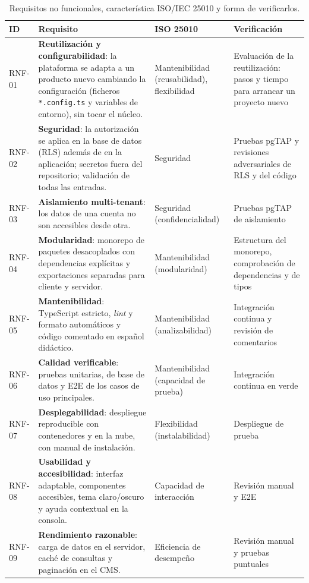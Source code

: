 \begin{table}[htbp]
  \centering
  \footnotesize
  \caption{Requisitos no funcionales, característica ISO/IEC 25010 y forma de verificarlos.}
  \label{tab:req-rnf}
  \begin{tabularx}{\textwidth}{@{}l>{\raggedright\arraybackslash}p{5.4cm}>{\raggedright\arraybackslash}p{2.2cm}X@{}}
    \toprule
    \textbf{ID} & \textbf{Requisito} & \textbf{ISO 25010} & \textbf{Verificación} \\
    \midrule
    RNF-01 & \textbf{Reutilización y configurabilidad}: la plataforma se adapta a un producto nuevo cambiando la configuración (ficheros \texttt{*.config.ts} y variables de entorno), sin tocar el núcleo. & Mantenibilidad (reusabilidad), flexibilidad & Evaluación de la reutilización: pasos y tiempo para arrancar un proyecto nuevo \\
    RNF-02 & \textbf{Seguridad}: la autorización se aplica en la base de datos (RLS) además de en la aplicación; secretos fuera del repositorio; validación de todas las entradas. & Seguridad & Pruebas pgTAP y revisiones adversariales de RLS y del código \\
    RNF-03 & \textbf{Aislamiento multi-tenant}: los datos de una cuenta no son accesibles desde otra. & Seguridad (confidencialidad) & Pruebas pgTAP de aislamiento \\
    RNF-04 & \textbf{Modularidad}: monorepo de paquetes desacoplados con dependencias explícitas y exportaciones separadas para cliente y servidor. & Mantenibilidad (modularidad) & Estructura del monorepo, comprobación de dependencias y de tipos \\
    RNF-05 & \textbf{Mantenibilidad}: TypeScript estricto, \textit{lint} y formato automáticos y código comentado en español didáctico. & Mantenibilidad (analizabilidad) & Integración continua y revisión de comentarios \\
    RNF-06 & \textbf{Calidad verificable}: pruebas unitarias, de base de datos y E2E de los casos de uso principales. & Mantenibilidad (capacidad de prueba) & Integración continua en verde \\
    RNF-07 & \textbf{Desplegabilidad}: despliegue reproducible con contenedores y en la nube, con manual de instalación. & Flexibilidad (instalabilidad) & Despliegue de prueba \\
    RNF-08 & \textbf{Usabilidad y accesibilidad}: interfaz adaptable, componentes accesibles, tema claro/oscuro y ayuda contextual en la consola. & Capacidad de interacción & Revisión manual y E2E \\
    RNF-09 & \textbf{Rendimiento razonable}: carga de datos en el servidor, caché de consultas y paginación en el CMS. & Eficiencia de desempeño & Revisión manual y pruebas puntuales \\
    \bottomrule
  \end{tabularx}
\end{table}

